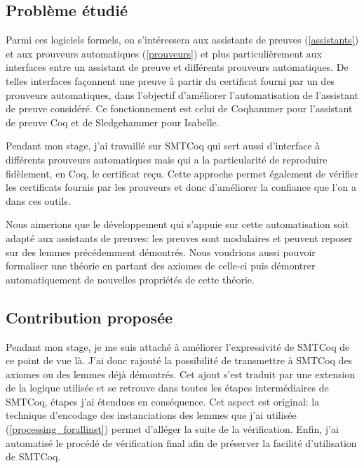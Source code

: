 \documentclass[11pt]{article}
\begin{document}
\subsection{Problème étudié}

Parmi ces logiciels formels, on s'intéressera aux assistants de preuves (\ref{assistants}) et aux prouveurs automatiques (\ref{prouveurs}) et plus particulièrement aux interfaces entre un assistant de preuve et différents prouveurs automatiques. De telles interfaces façonnent une preuve à partir du certificat fourni par un des prouveurs automatiques, dans l'objectif d'améliorer l'automatisation de l'assistant de preuve considéré. Ce fonctionnement est celui de Coqhammer \cite{coqhammer} pour l'assistant de preuve Coq et de Sledgehammer \cite{sledgehammer_manual} pour Isabelle. \medbreak

Pendant mon stage, j'ai travaillé sur SMTCoq \cite{smtcoq_code, these_keller} qui sert aussi d'interface à différents prouveurs automatiques mais qui a la particularité de reproduire fidèlement, en Coq, le certificat reçu. Cette approche permet également de vérifier les certificats fournis par les prouveurs et donc d'améliorer la confiance que l'on a dans ces outils.\medbreak

Nous aimerions que le développement qui s'appuie sur cette automatisation soit adapté aux assistants de preuves: les preuves sont modulaires et peuvent reposer sur des lemmes précédemment démontrés. Nous voudrions aussi pouvoir formaliser une théorie en partant des axiomes de celle-ci puis démontrer automatiquement de nouvelles propriétés de cette théorie.

\subsection{Contribution proposée}

Pendant mon stage, je me suis attaché à améliorer l'expressivité de SMTCoq de ce point de vue là. J'ai donc rajouté la possibilité de transmettre à SMTCoq des axiomes ou des lemmes déjà démontrés. Cet ajout s'est traduit par une extension de la logique utilisée et se retrouve dans toutes les étapes intermédiaires de SMTCoq, étapes j'ai étendues en conséquence.  Cet aspect est original: la technique d'encodage des instanciations des lemmes que j'ai utilisée (\ref{processing_forallinst}) permet d'alléger la suite de la vérification. Enfin, j'ai automatisé le procédé de vérification final afin de préserver la facilité d'utili\-sation de SMTCoq.
\end{document}
